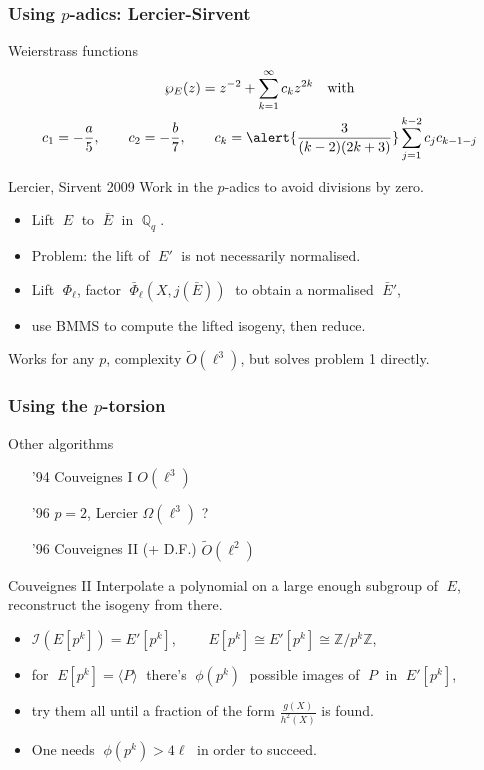 \documentclass[10pt]{beamer}
\newcommand{\Z}{\mathbb{Z}}  %
\newcommand{\Q}{\mathbb{Q}}  %
\newcommand{\isom}{\cong}  %
\newcommand{\euler}{\phi}  %
\newcommand{\0}{\mathcal{O}}  %
\newcommand{\isog}[1]{\mathcal{#1}}  %
\newcommand{\I}{\isog{I}}  %
\newcommand{\tildO}{\tilde{O}}  %
\begin{document}
\begin{frame}
  \frametitle{Using $p$-adics: Lercier-Sirvent}

  \begin{block}{Weierstrass functions}
    \vspace{-3mm}
    \begin{gather*}
      \wp_E(z) = z^{-2} + \sum_{k=1}^{\infty}c_kz^{2k} \quad\text{with}\\
      c_1 = -\frac{a}{5}, \qquad c_2 = -\frac{b}{7}, 
      \qquad c_k = \alert{\frac{3}{(k-2)(2k+3)}}\sum_{j=1}^{k-2}c_jc_{k-1-j}
    \end{gather*}
  \end{block}

  \begin{block}{Lercier, Sirvent 2009}
    Work in the $p$-adics to avoid divisions by zero.
    \begin{itemize}
    \item Lift $\;E\;$ to $\;\bar{E}\;$ in $\;\Q_q\;$.
    \item Problem: the lift of $\;E'\;$ is not necessarily normalised.
    \item Lift $\;\Phi_\ell$, factor $\;\bar{\Phi}_\ell(X,j(\bar{E}))\;$ to
      obtain a normalised $\;\bar{E}'$,
    \item use BMMS to compute the lifted isogeny, then reduce.
    \end{itemize}
    Works for any $p$, complexity $\tildO(\ell^3)$, but solves problem
    1 directly.
  \end{block}
\end{frame}


\begin{frame}
  \frametitle{Using the $p$-torsion}

  \begin{block}{Other algorithms}
    \begin{itemize}
    \item['94] Couveignes I \hfill $O(\ell^3)$
    \item['96] $p=2$, Lercier \hfill $\Omega(\ell^3)$ ?
    \item['96] Couveignes II (+ D.F.) \hfill $\tildO(\ell^2)$
    \end{itemize}
  \end{block}
  
  \begin{block}{Couveignes II}
    Interpolate a polynomial on a large enough subgroup of $\;E$,
    reconstruct the isogeny from there.
    \begin{itemize}
    \item $\I(E[p^k]) = E'[p^k]$, $\qquad E[p^k] \isom E'[p^k] \isom \Z/p^k\Z$,
    \item for $\;E[p^k] = \langle P\rangle\;$ there's $\;\euler(p^k)\;$
      possible images of $\;P\;$ in $\;E'[p^k]$,
    \item try them all until a fraction of the form
      $\frac{g(X)}{h^2(X)}$ is found.
    \item One needs $\;\euler(p^k) > 4\ell\;$ in order to succeed.
    \end{itemize}
  \end{block}
\end{frame}
\end{document}
